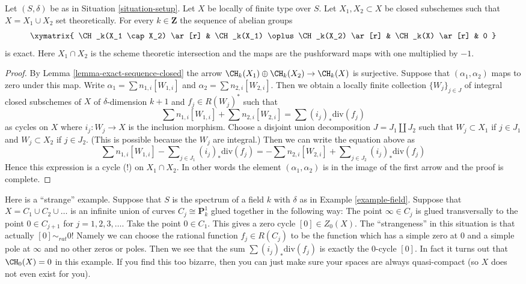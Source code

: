 \begin{lemma}
\label{lemma-exact-sequence-closed-chow}
Let $(S, \delta)$ be as in Situation \ref{situation-setup}.
Let $X$ be locally of finite type over $S$. Let $X_1, X_2 \subset X$
be closed subschemes such that $X = X_1 \cup X_2$ set theoretically.
For every $k \in \mathbf{Z}$ the sequence of abelian groups
$$
\xymatrix{
\CH_k(X_1 \cap X_2) \ar[r] &
\CH_k(X_1) \oplus \CH_k(X_2) \ar[r] &
\CH_k(X) \ar[r] &
0
}
$$
is exact. Here $X_1 \cap X_2$ is the scheme theoretic intersection and the
maps are the pushforward maps with one multiplied by $-1$.
\end{lemma}

\begin{proof}
By Lemma \ref{lemma-exact-sequence-closed} the arrow
$\CH_k(X_1) \oplus \CH_k(X_2) \to \CH_k(X)$ is surjective.
Suppose that $(\alpha_1, \alpha_2)$ maps to zero under this map.
Write $\alpha_1 = \sum n_{1, i}[W_{1, i}]$ and
$\alpha_2 = \sum n_{2, i}[W_{2, i}]$. Then we obtain a locally
finite collection $\{W_j\}_{j \in J}$ of integral closed
subschemes of $X$ of $\delta$-dimension $k + 1$ and $f_j \in R(W_j)^*$
such that
$$
\sum n_{1, i}[W_{1, i}] + \sum n_{2, i}[W_{2, i}] = \sum (i_j)_*\text{div}(f_j)
$$
as cycles on $X$ where $i_j : W_j \to X$ is the inclusion morphism.
Choose a disjoint union decomposition $J = J_1 \amalg J_2$ such that
$W_j \subset X_1$ if $j \in J_1$ and $W_j \subset X_2$ if $j \in J_2$.
(This is possible because the $W_j$ are integral.) Then we can write
the equation above as
$$
\sum n_{1, i}[W_{1, i}] - \sum\nolimits_{j \in J_1} (i_j)_*\text{div}(f_j) =
- \sum n_{2, i}[W_{2, i}] + \sum\nolimits_{j \in J_2} (i_j)_*\text{div}(f_j)
$$
Hence this expression is a cycle (!) on $X_1 \cap X_2$. In other words
the element $(\alpha_1, \alpha_2)$ is in the image of the first arrow
and the proof is complete.
\end{proof}

\begin{example}
\label{example-weird}
Here is a ``strange'' example.
Suppose that $S$ is the spectrum of a field $k$
with $\delta$ as in Example \ref{example-field}.
Suppose that $X = C_1 \cup C_2 \cup \ldots$ is an infinite
union of curves $C_j \cong \mathbf{P}^1_k$ glued together
in the following way: The point $\infty \in C_j$ is glued
transversally to the point $0 \in C_{j + 1}$ for $j = 1, 2, 3, \ldots$.
Take the point $0 \in C_1$. This gives a zero cycle
$[0] \in Z_0(X)$. The ``strangeness'' in this situation is
that actually $[0] \sim_{rat} 0$! Namely we can choose
the rational function $f_j \in R(C_j)$ to be the function
which has a simple zero at $0$ and a simple pole at $\infty$
and no other zeros or poles. Then we see that the sum
$\sum (i_j)_*\text{div}(f_j)$ is exactly the $0$-cycle
$[0]$. In fact it turns out that $\CH_0(X) = 0$ in this example.
If you find this too bizarre, then you can just
make sure your spaces are always quasi-compact
(so $X$ does not even exist for you).
\end{example}

